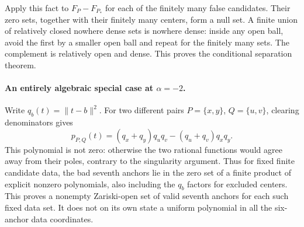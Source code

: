 \documentclass[11pt]{article}
\begin{document}
Apply this fact to $F_P-F_{P_*}$ for each of the finitely many false candidates.
Their zero sets, together with their finitely many centers, form a null set.
A finite union of relatively closed nowhere dense sets is nowhere dense:
inside any open ball, avoid the first by a smaller open ball and repeat for
the finitely many sets. The complement is relatively open and dense.
This proves the conditional separation theorem.

\paragraph{An entirely algebraic special case at $\alpha=-2$.}
Write $q_b(t)=\|t-b\|^2$. For two different pairs $P=\{x,y\}$,
$Q=\{u,v\}$, clearing denominators gives
\[
 p_{P,Q}(t)=(q_x+q_y)q_uq_v-(q_u+q_v)q_xq_y.
\]
This polynomial is not zero: otherwise the two rational functions would agree
away from their poles, contrary to the singularity argument.
Thus for fixed finite candidate data, the bad seventh anchors lie in the zero
set of a finite product of explicit nonzero polynomials, also including the
$q_b$ factors for excluded centers. This proves a nonempty Zariski-open set
of valid seventh anchors for each such fixed data set. It does not on its own
state a uniform polynomial in all the six-anchor data coordinates.
\end{document}
